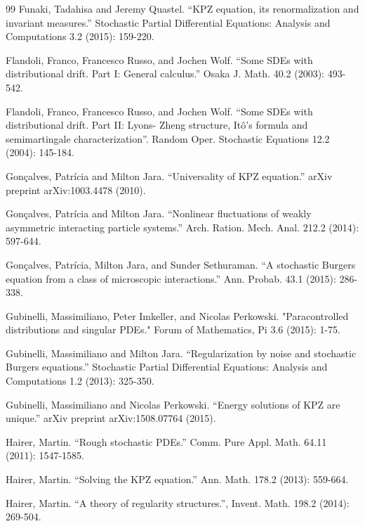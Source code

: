 \documentclass[a4paper,11pt]{article}
\newcommand{\1}{\mathds{1}}
\begin{document}
\begin{thebibliography}{99}
     Funaki, Tadahisa and Jeremy Quastel. ``KPZ equation, its renormalization and invariant measures.'' Stochastic Partial Differential Equations: Analysis and Computations 3.2 (2015): 159-220.

    Flandoli, Franco, Francesco Russo, and Jochen Wolf. ``Some SDEs with distributional drift. Part I: General calculus.'' Osaka J. Math. 40.2 (2003): 493-542.

    Flandoli, Franco, Francesco Russo, and Jochen Wolf. ``Some SDEs with distributional drift. Part II: Lyons- Zheng structure, It\^o's formula and semimartingale characterization''. Random Oper. Stochastic Equations 12.2 (2004): 145-184.

     Gon\c calves, Patr\'icia and Milton Jara. ``Universality of KPZ equation.'' arXiv preprint arXiv:1003.4478 (2010).

     Gon\c calves, Patr\'icia and Milton Jara. ``Nonlinear fluctuations of weakly
     asymmetric interacting particle systems.'' Arch. Ration. Mech. Anal. 212.2 (2014): 597-644.

     Gon\c calves, Patr\'icia, Milton Jara, and Sunder Sethuraman. ``A stochastic Burgers equation from a class of microscopic interactions.'' Ann. Probab. 43.1 (2015): 286-338.

    Gubinelli, Massimiliano, Peter Imkeller, and Nicolas Perkowski. "Paracontrolled distributions and singular PDEs." Forum of Mathematics, Pi 3.6 (2015): 1-75.

    Gubinelli, Massimiliano and Milton Jara. ``Regularization by noise and
    stochastic Burgers equations.'' Stochastic Partial Differential Equations:
    Analysis and Computations 1.2 (2013): 325-350.
    
     Gubinelli, Massimiliano and Nicolas Perkowski. ``Energy solutions of KPZ are unique.'' arXiv preprint arXiv:1508.07764 (2015).

     Hairer, Martin. ``Rough stochastic PDEs.'' Comm. Pure Appl. Math. 64.11 (2011): 1547-1585.

     Hairer, Martin. ``Solving the KPZ equation.'' Ann. Math. 178.2 (2013): 559-664.

     Hairer, Martin. ``A theory of regularity structures.'', Invent. Math. 198.2 (2014): 269-504.


\end{thebibliography}
\end{document}
